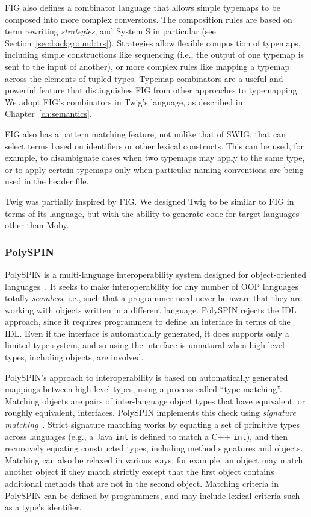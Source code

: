 FIG also defines a combinator language that allows simple typemaps
to be composed into more complex conversions. The composition
rules are based on term rewriting \emph{strategies}, and System S
in particular (see Section~\ref{sec:background:trs}). Strategies
allow flexible composition of typemaps, including simple
constructions like sequencing (i.e., the output of one typemap is
sent to the input of another), or more complex rules like mapping
a typemap across the elements of tupled types. Typemap combinators
are a useful and powerful feature that distinguishes FIG from
other approaches to typemapping. We adopt FIG's combinators in
Twig's language, as described in Chapter~\ref{ch:semantics}.

FIG also has a pattern matching feature, not unlike that of SWIG,
that can select terms based on identifiers or other lexical
constructs. This can be used, for example, to disambiguate cases
when two typemaps may apply to the same type, or to apply certain
typemaps only when particular naming conventions are being used in
the header file.

Twig was partially inspired by FIG. We designed Twig to be similar
to FIG in terms of its language, but with the ability to generate
code for target languages other than Moby.



\subsubsection{PolySPIN}

PolySPIN is a multi-language interoperability system designed for object-oriented languages~\cite{barrett96polyspin}. It seeks to make interoperability for any number of OOP languages totally \emph{seamless}, i.e., such that a programmer need never be aware that they are working with objects written in a different language. PolySPIN rejects the IDL approach, since it requires programmers to define an interface in terms of the IDL. Even if the interface is automatically generated, it does supports only a limited type system, and so using the interface is unnatural when high-level types, including objects, are involved.

PolySPIN's approach to interoperability is based on automatically generated mappings between high-level types, using a process called ``type matching''. Matching objects are pairs of inter-language object types that have equivalent, or roughly equivalent, interfaces. PolySPIN implements this check using \emph{signature matching}~\cite{zaremski93matching}. Strict signature matching works by equating a set of primitive types across languages (e.g., a Java \texttt{int} is defined to match a C++ \texttt{int}), and then recursively equating constructed types, including method signatures and objects. Matching can also be relaxed in various ways; for example, an object may match another object if they match strictly except that the first object contains additional methods that are not in the second object. Matching criteria in PolySPIN can be defined by programmers, and may include lexical criteria such as a type's identifier.

